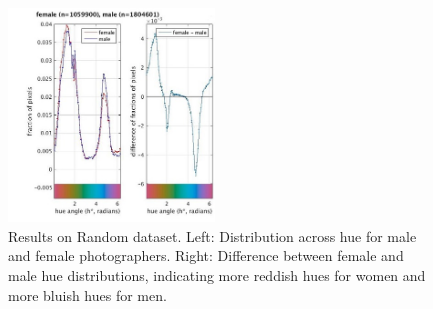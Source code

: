\begin{figure}[t]
 \centering
    \includegraphics[width=0.489\textwidth]{figures/chapter3/randomhuesmall.jpg}
 \caption{Results on Random dataset. Left: Distribution across hue for male and female photographers. Right: Difference between female and male hue distributions, indicating more reddish hues for women and more bluish hues for men.}
 \label{fig:random}
\end{figure}

